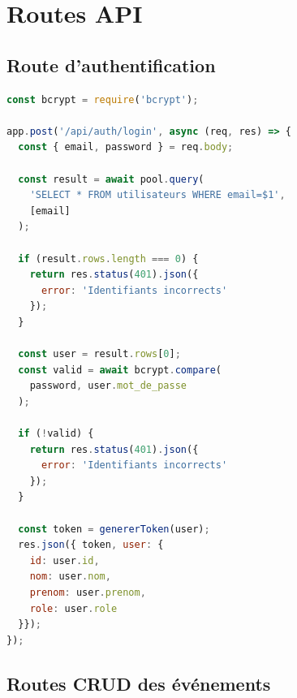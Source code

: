 \section{Routes API}

\subsection{Route d'authentification}

\begin{lstlisting}[language=JavaScript,caption={Route de connexion},label={lst:route_login}]
const bcrypt = require('bcrypt');

app.post('/api/auth/login', async (req, res) => {
  const { email, password } = req.body;

  const result = await pool.query(
    'SELECT * FROM utilisateurs WHERE email=$1',
    [email]
  );

  if (result.rows.length === 0) {
    return res.status(401).json({
      error: 'Identifiants incorrects'
    });
  }

  const user = result.rows[0];
  const valid = await bcrypt.compare(
    password, user.mot_de_passe
  );

  if (!valid) {
    return res.status(401).json({
      error: 'Identifiants incorrects'
    });
  }

  const token = genererToken(user);
  res.json({ token, user: {
    id: user.id,
    nom: user.nom,
    prenom: user.prenom,
    role: user.role
  }});
});
\end{lstlisting}

\subsection{Routes CRUD des \'ev\'enements}

